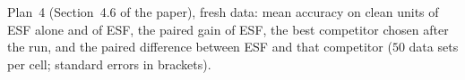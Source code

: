 \begin{table}[htbp]
\centering
\scriptsize
\caption{Plan~4 (Section~4.6 of the paper), fresh data: mean accuracy on clean units of ESF alone
and of ESF, the paired gain of ESF, the best competitor chosen after the run,
and the paired difference between ESF and that competitor ($50$ data sets per cell;
standard errors in brackets).}
\label{tab:plan4}
\resizebox{\textwidth}{!}{}
\end{table}

